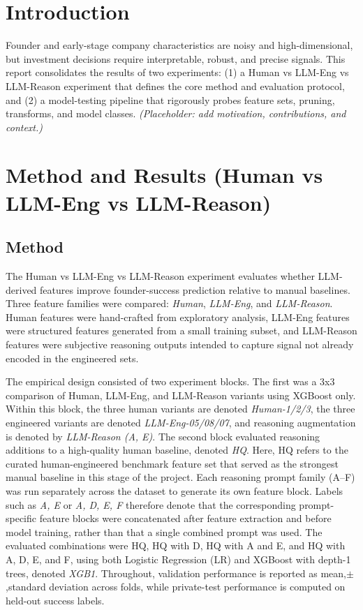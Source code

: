 \documentclass{article}
\theoremstyle{plain}
\theoremstyle{definition}
\theoremstyle{remark}
\begin{document}
\section{Introduction}
Founder and early-stage company characteristics are noisy and high-dimensional, but investment decisions require interpretable, robust, and precise signals. This report consolidates the results of two experiments: (1) a Human vs LLM-Eng vs LLM-Reason experiment that defines the core method and evaluation protocol, and (2) a model-testing pipeline that rigorously probes feature sets, pruning, transforms, and model classes. \textit{(Placeholder: add motivation, contributions, and context.)}

\section{Method and Results (Human vs LLM-Eng vs LLM-Reason)}
\subsection{Method}
The Human vs LLM-Eng vs LLM-Reason experiment evaluates whether LLM-derived features improve founder-success prediction relative to manual baselines. Three feature families were compared: \textit{Human}, \textit{LLM-Eng}, and \textit{LLM-Reason}. Human features were hand-crafted from exploratory analysis, LLM-Eng features were structured features generated from a small training subset, and LLM-Reason features were subjective reasoning outputs intended to capture signal not already encoded in the engineered sets.

The empirical design consisted of two experiment blocks. The first was a 3x3 comparison of Human, LLM-Eng, and LLM-Reason variants using XGBoost only. Within this block, the three human variants are denoted \textit{Human-1/2/3}, the three engineered variants are denoted \textit{LLM-Eng-05/08/07}, and reasoning augmentation is denoted by \textit{LLM-Reason (A, E)}. The second block evaluated reasoning additions to a high-quality human baseline, denoted \textit{HQ}. Here, HQ refers to the curated human-engineered benchmark feature set that served as the strongest manual baseline in this stage of the project. Each reasoning prompt family (A--F) was run separately across the dataset to generate its own feature block. Labels such as \textit{A, E} or \textit{A, D, E, F} therefore denote that the corresponding prompt-specific feature blocks were concatenated after feature extraction and before model training, rather than that a single combined prompt was used. The evaluated combinations were HQ, HQ with D, HQ with A and E, and HQ with A, D, E, and F, using both Logistic Regression (LR) and XGBoost with depth-1 trees, denoted \textit{XGB1}. Throughout, validation performance is reported as mean,$\pm$,standard deviation across folds, while private-test performance is computed on held-out success labels.
\end{document}
